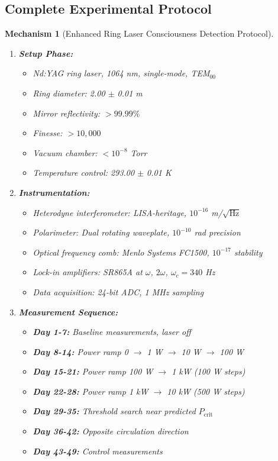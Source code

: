 \documentclass[11pt]{article}
\newtheorem{mechanism}[theorem]{Mechanism}
\theoremstyle{definition}
\begin{document}
\subsection{Complete Experimental Protocol}

\begin{mechanism}[Enhanced Ring Laser Consciousness Detection Protocol]
\begin{enumerate}
\item \textbf{Setup Phase:}
   \begin{itemize}
   \item Nd:YAG ring laser, 1064 nm, single-mode, TEM$_{00}$
   \item Ring diameter: 2.00 $\pm$ 0.01 m
   \item Mirror reflectivity: $> 99.99\%$
   \item Finesse: $> 10,000$
   \item Vacuum chamber: $< 10^{-8}$ Torr
   \item Temperature control: 293.00 $\pm$ 0.01 K
   \end{itemize}

\item \textbf{Instrumentation:}
   \begin{itemize}
   \item Heterodyne interferometer: LISA-heritage, $10^{-16}$ m/$\sqrt{\text{Hz}}$
   \item Polarimeter: Dual rotating waveplate, $10^{-10}$ rad precision
   \item Optical frequency comb: Menlo Systems FC1500, $10^{-17}$ stability
   \item Lock-in amplifiers: SR865A at $\omega$, $2\omega$, $\omega_c = 340$ Hz
   \item Data acquisition: 24-bit ADC, 1 MHz sampling
   \end{itemize}

\item \textbf{Measurement Sequence:}
   \begin{itemize}
   \item \textbf{Day 1-7:} Baseline measurements, laser off
   \item \textbf{Day 8-14:} Power ramp 0 $\to$ 1 W $\to$ 10 W $\to$ 100 W
   \item \textbf{Day 15-21:} Power ramp 100 W $\to$ 1 kW (100 W steps)
   \item \textbf{Day 22-28:} Power ramp 1 kW $\to$ 10 kW (500 W steps)
   \item \textbf{Day 29-35:} Threshold search near predicted $P_{\text{crit}}$
   \item \textbf{Day 36-42:} Opposite circulation direction
   \item \textbf{Day 43-49:} Control measurements
   \end{itemize}


\end{enumerate}
\end{mechanism}
\end{document}

